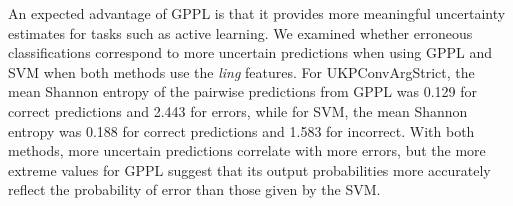 % 


An expected advantage of GPPL is that it provides more meaningful uncertainty estimates for tasks such as active learning. 
We examined whether erroneous classifications correspond to more uncertain predictions
when using GPPL and SVM when both methods use the \emph{ling} features.
For UKPConvArgStrict, the mean Shannon entropy
of the pairwise predictions from GPPL 
was 0.129 for correct predictions and 2.443 for errors,
while for SVM, the mean Shannon entropy was  0.188 for correct predictions and 
1.583 for incorrect.
With both methods, more uncertain predictions correlate with more errors,
but the more extreme values for GPPL suggest that its output probabilities more 
accurately reflect the probability of error than those given by the SVM.

